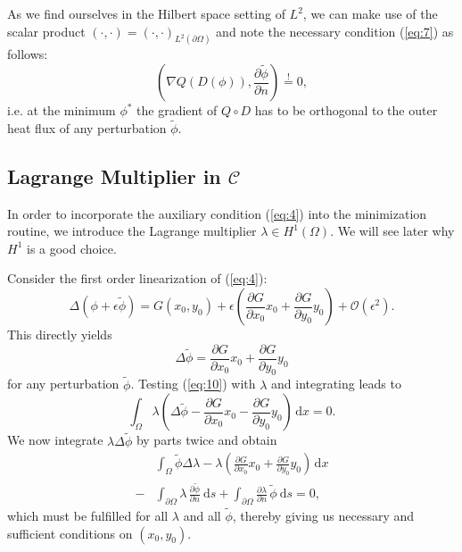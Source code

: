 As we find ourselves in the Hilbert space setting of $L^2$, we can make use of the scalar product $\left(\cdot,\cdot\right) = \left(\cdot,\cdot\right)_{L^2(\partial \Omega)}$ and note the necessary condition (\ref{eq:7}) as follows:
\begin{equation}\label{eq:8}
	\left(\nabla Q(D(\phi)),\frac{\partial \widetilde{\phi}}{\partial n}\right)
	\overset{!}{=}0,
\end{equation}
i.e. at the minimum $\phi^*$ the gradient of $Q\circ D$ has to be orthogonal to the outer heat flux of any perturbation $\widetilde{\phi}$.

\subsection{Lagrange Multiplier in $\mathcal C$}
In order to incorporate the auxiliary condition (\ref{eq:4}) into the minimization routine, we introduce the Lagrange multiplier $\lambda\in H^1(\Omega)$. We will see later why $H^1$ is a good choice.

Consider the first order linearization of (\ref{eq:4}):
\begin{equation}\label{eq:9}
	\Delta\left(\phi+\epsilon\widetilde{\phi}\right)
	= G(x_0,y_0)+\epsilon
		\left(\frac{\partial G}{\partial x_0}x_0+\frac{\partial G}{\partial y_0}y_0\right)
		+ \mathcal O(\epsilon^2).
\end{equation}
This directly yields
\begin{equation}\label{eq:10}
	\Delta\widetilde{\phi} 
	= \frac{\partial G}{\partial x_0}x_0+\frac{\partial G}{\partial y_0}y_0
\end{equation}
for any perturbation $\widetilde{\phi}$.
Testing (\ref{eq:10}) with $\lambda$ and integrating leads to
\begin{equation}\label{eq:11}
	\int_\Omega \lambda \left( 
		\Delta\widetilde{\phi} 
		- \frac{\partial G}{\partial x_0}x_0-\frac{\partial G}{\partial y_0}y_0
	\right)\,\mathrm{d}x
	= 0.
\end{equation}
We now integrate $\lambda\Delta \widetilde{\phi}$ by parts twice and obtain
\begin{align}\label{eq:12}
	&\int_\Omega \widetilde{\phi} \Delta\lambda
	-\lambda \left( 
	 \frac{\partial G}{\partial x_0}x_0+\frac{\partial G}{\partial y_0}y_0
	\right)\,\mathrm{d}x\\
	-&\int_{\partial \Omega} \lambda \,\frac{\partial\widetilde{\phi}}{\partial n}\:\mathrm{d}s
	+\int_{\partial \Omega}\frac{\partial\lambda}{\partial n}\,\widetilde{\phi}\:\mathrm{d}s
	= 0,\nonumber
\end{align}
which must be fulfilled for all $\lambda$ and all $\widetilde{\phi}$, thereby giving us necessary and sufficient conditions on $(x_0,y_0)$.